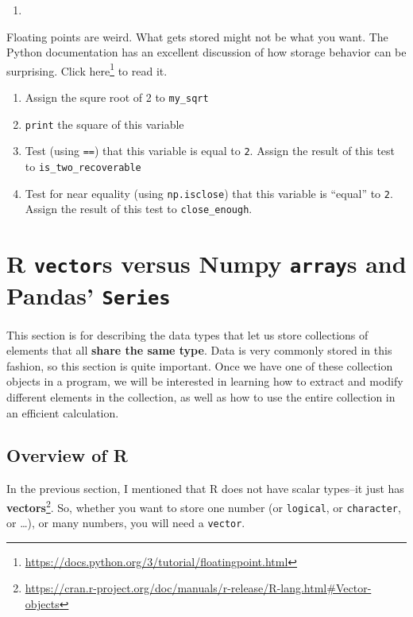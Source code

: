 \documentclass[12pt,krantz2]{krantz}
\providecommand{\tightlist}{%
  \setlength{\itemsep}{0pt}\setlength{\parskip}{0pt}}
\renewcommand{\href}[2]{#2\footnote{\url{#1}}}
\begin{document}
\begin{enumerate}
\def\labelenumi{\arabic{enumi}.}
\setcounter{enumi}{2}
\item
\end{enumerate}

Floating points are weird. What gets stored might not be what you want. The Python documentation has an excellent discussion of how storage behavior can be surprising. Click \href{https://docs.python.org/3/tutorial/floatingpoint.html}{here} to read it.

\begin{enumerate}
\def\labelenumi{\alph{enumi})}
\tightlist
\item
  Assign the squre root of 2 to \texttt{my\_sqrt}
\item
  \texttt{print} the square of this variable
\item
  Test (using \texttt{==}) that this variable is equal to \texttt{2}. Assign the result of this test to \texttt{is\_two\_recoverable}
\item
  Test for near equality (using \texttt{np.isclose}) that this variable is ``equal'' to \texttt{2}. Assign the result of this test to \texttt{close\_enough}.
\end{enumerate}

\hypertarget{r-vectors-versus-numpy-arrays-and-pandas-series}{%
\chapter{\texorpdfstring{R \texttt{vector}s versus Numpy \texttt{array}s and Pandas' \texttt{Series}}{R vectors versus Numpy arrays and Pandas' Series}}\label{r-vectors-versus-numpy-arrays-and-pandas-series}}

This section is for describing the data types that let us store collections of elements that all \textbf{share the same type}. Data is very commonly stored in this fashion, so this section is quite important. Once we have one of these collection objects in a program, we will be interested in learning how to extract and modify different elements in the collection, as well as how to use the entire collection in an efficient calculation.

\hypertarget{overview-of-r}{%
\section{Overview of R}\label{overview-of-r}}

In the previous section, I mentioned that R does not have scalar types--it just has \href{https://cran.r-project.org/doc/manuals/r-release/R-lang.html\#Vector-objects}{\textbf{vectors}}. So, whether you want to store one number (or \texttt{logical}, or \texttt{character}, or \ldots{}), or many numbers, you will need a \texttt{vector}.
\end{document}
